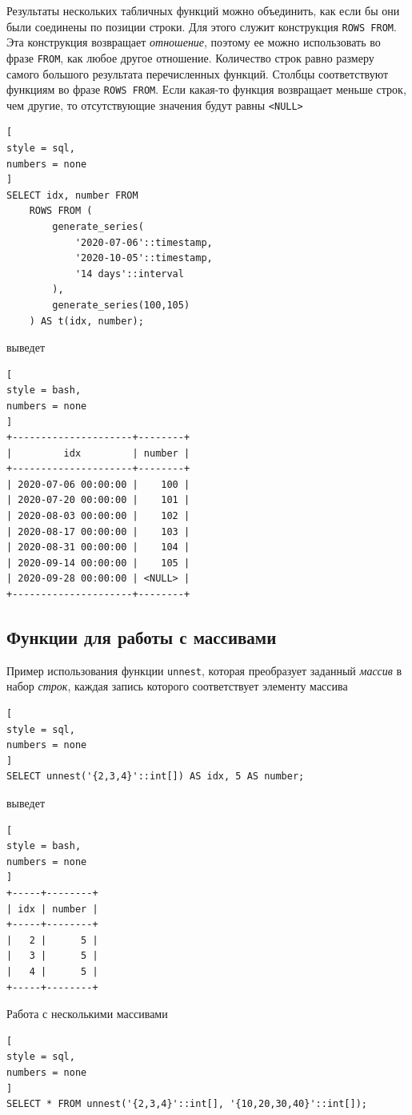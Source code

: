 \documentclass[%
	11pt,
	a4paper,
	utf8,
		]{article}
\begin{document}
Результаты нескольких табличных функций можно объединить, как если бы они были соединены по позиции строки. Для этого служит конструкция \texttt{ROWS FROM}. Эта конструкция возвращает \emph{отношение}, поэтому ее можно использовать во фразе \texttt{FROM}, как любое другое отношение. Количество строк равно размеру самого большого результата перечисленных функций. Столбцы соответствуют функциям во фразе \texttt{ROWS FROM}. Если какая-то функция возвращает меньше строк, чем другие, то отсутствующие значения будут равны \texttt{<NULL>}
\begin{lstlisting}[
style = sql,
numbers = none
]
SELECT idx, number FROM
    ROWS FROM (
        generate_series(
            '2020-07-06'::timestamp,
            '2020-10-05'::timestamp,
            '14 days'::interval
        ),
        generate_series(100,105)
    ) AS t(idx, number);
\end{lstlisting}
выведет
\begin{lstlisting}[
style = bash,
numbers = none
]
+---------------------+--------+
|         idx         | number |
+---------------------+--------+
| 2020-07-06 00:00:00 |    100 |
| 2020-07-20 00:00:00 |    101 |
| 2020-08-03 00:00:00 |    102 |
| 2020-08-17 00:00:00 |    103 |
| 2020-08-31 00:00:00 |    104 |
| 2020-09-14 00:00:00 |    105 |
| 2020-09-28 00:00:00 | <NULL> |
+---------------------+--------+
\end{lstlisting}


\subsection{Функции для работы с массивами}

Пример использования функции \texttt{unnest}, которая преобразует заданный \emph{массив} в набор \emph{строк}, каждая запись которого соответствует элементу массива
\begin{lstlisting}[
style = sql,
numbers = none
]
SELECT unnest('{2,3,4}'::int[]) AS idx, 5 AS number;
\end{lstlisting}
выведет
\begin{lstlisting}[
style = bash,
numbers = none
]
+-----+--------+
| idx | number |
+-----+--------+
|   2 |      5 |
|   3 |      5 |
|   4 |      5 |
+-----+--------+
\end{lstlisting}

Работа с несколькими массивами
\begin{lstlisting}[
style = sql,
numbers = none
]
SELECT * FROM unnest('{2,3,4}'::int[], '{10,20,30,40}'::int[]);
\end{lstlisting}
\end{document}
